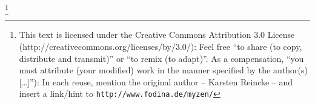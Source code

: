%
%
% 
% 
% 

\footnote{This text is licensed under the Creative Commons Attribution 3.0
License (http://creativecommons.org/licenses/by/3.0/): Feel free \enquote{to
share (to copy, distribute and transmit)} or \enquote{to remix (to adapt)}. As
a compensation, \enquote{you must attribute (your modified) work in the manner
specified by the author(s) [\ldots]}): In each reuse, mention the original
author -- Karsten Reincke -- and insert a link/hint to
\texttt{http://www.fodina.de/myzen/} }


